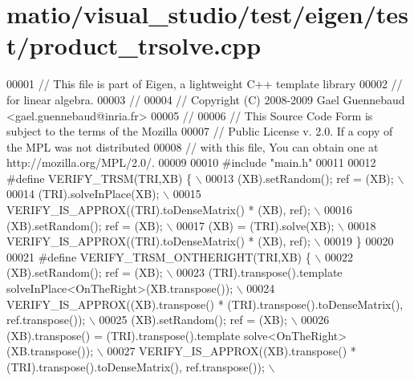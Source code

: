 \hypertarget{matio_2visual__studio_2test_2eigen_2test_2product__trsolve_8cpp_source}{}\section{matio/visual\+\_\+studio/test/eigen/test/product\+\_\+trsolve.cpp}
\label{matio_2visual__studio_2test_2eigen_2test_2product__trsolve_8cpp_source}

\begin{DoxyCode}
00001 \textcolor{comment}{// This file is part of Eigen, a lightweight C++ template library}
00002 \textcolor{comment}{// for linear algebra.}
00003 \textcolor{comment}{//}
00004 \textcolor{comment}{// Copyright (C) 2008-2009 Gael Guennebaud <gael.guennebaud@inria.fr>}
00005 \textcolor{comment}{//}
00006 \textcolor{comment}{// This Source Code Form is subject to the terms of the Mozilla}
00007 \textcolor{comment}{// Public License v. 2.0. If a copy of the MPL was not distributed}
00008 \textcolor{comment}{// with this file, You can obtain one at http://mozilla.org/MPL/2.0/.}
00009 
00010 \textcolor{preprocessor}{#include "main.h"}
00011 
00012 \textcolor{preprocessor}{#define VERIFY\_TRSM(TRI,XB) \{ \(\backslash\)}
00013 \textcolor{preprocessor}{    (XB).setRandom(); ref = (XB); \(\backslash\)}
00014 \textcolor{preprocessor}{    (TRI).solveInPlace(XB); \(\backslash\)}
00015 \textcolor{preprocessor}{    VERIFY\_IS\_APPROX((TRI).toDenseMatrix() * (XB), ref); \(\backslash\)}
00016 \textcolor{preprocessor}{    (XB).setRandom(); ref = (XB); \(\backslash\)}
00017 \textcolor{preprocessor}{    (XB) = (TRI).solve(XB); \(\backslash\)}
00018 \textcolor{preprocessor}{    VERIFY\_IS\_APPROX((TRI).toDenseMatrix() * (XB), ref); \(\backslash\)}
00019 \textcolor{preprocessor}{  \}}
00020 
00021 \textcolor{preprocessor}{#define VERIFY\_TRSM\_ONTHERIGHT(TRI,XB) \{ \(\backslash\)}
00022 \textcolor{preprocessor}{    (XB).setRandom(); ref = (XB); \(\backslash\)}
00023 \textcolor{preprocessor}{    (TRI).transpose().template solveInPlace<OnTheRight>(XB.transpose()); \(\backslash\)}
00024 \textcolor{preprocessor}{    VERIFY\_IS\_APPROX((XB).transpose() * (TRI).transpose().toDenseMatrix(), ref.transpose()); \(\backslash\)}
00025 \textcolor{preprocessor}{    (XB).setRandom(); ref = (XB); \(\backslash\)}
00026 \textcolor{preprocessor}{    (XB).transpose() = (TRI).transpose().template solve<OnTheRight>(XB.transpose()); \(\backslash\)}
00027 \textcolor{preprocessor}{    VERIFY\_IS\_APPROX((XB).transpose() * (TRI).transpose().toDenseMatrix(), ref.transpose()); \(\backslash\)}

\end{DoxyCode}
